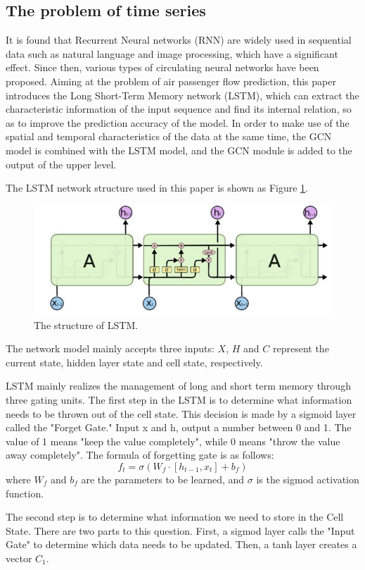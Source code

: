 \documentclass[journal,article,submit,moreauthors,pdftex]{Definitions/mdpi}
\begin{document}
\subsection{The problem of time series}
It is found that Recurrent Neural networks (RNN) are widely used in sequential data such as natural language and image processing, which have a significant effect. Since then, various types of circulating neural networks have been proposed. Aiming at the problem of air passenger flow prediction, this paper introduces the Long Short-Term Memory network (LSTM), which can extract the characteristic information of the input sequence and find its internal relation, so as to improve the prediction accuracy of the model. In order to make use of the spatial and temporal characteristics of the data at the same time, the GCN model is combined with the LSTM model, and the GCN module is added to the output of the upper level.
\par The LSTM network structure used in this paper is shown as Figure \ref{fig:lstm}.
\begin{figure}
    \centering
    \includegraphics[width=8 cm]{./imgs/LSTMpng.png}
    \caption{The structure of LSTM.}
    \label{fig:lstm}
\end{figure}
\par The network model mainly accepts three inputs: $X$, $H$ and $C$ represent the current state, hidden layer state and cell state, respectively.
\par LSTM mainly realizes the management of long and short term memory through three gating units. The first step in the LSTM is to determine what information needs to be thrown out of the cell state. This decision is made by a sigmoid layer called the "Forget Gate." Input x and h, output a number between 0 and 1. The value of 1 means "keep the value completely", while 0 means "throw the value away completely". The formula of forgetting gate is as follows:
\begin{equation}
    f_{t}=\sigma\left(W_{f} \cdot\left[h_{t-1}, x_{t}\right]+b_{f}\right)
\end{equation}
where $W_{f}$ and $b_{f}$ are the parameters to be learned, and $\sigma$ is the sigmod activation function.
\par The second step is to determine what information we need to store in the Cell State. There are two parts to this question. First, a sigmod layer calls the "Input Gate" to determine which data needs to be updated. Then, a tanh layer creates a vector $C_{1}$.
\end{document}
